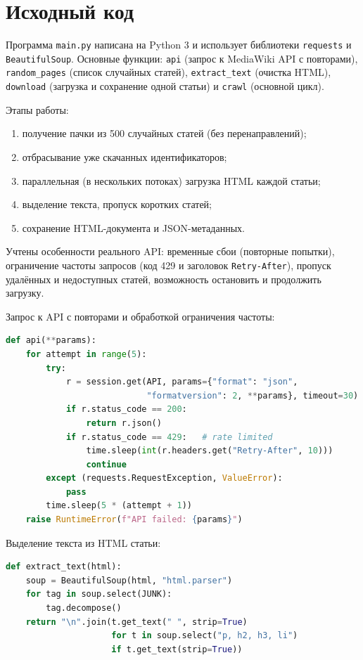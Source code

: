 \section{Исходный код}
Программа \texttt{main.py} написана на Python 3 и использует библиотеки
\texttt{requests} и \texttt{BeautifulSoup}. Основные функции: \texttt{api} (запрос
к MediaWiki API с повторами), \texttt{random\_pages} (список случайных статей),
\texttt{extract\_text} (очистка HTML), \texttt{download} (загрузка и сохранение
одной статьи) и \texttt{crawl} (основной цикл).

Этапы работы:
\begin{enumerate}
    \item получение пачки из 500 случайных статей (без перенаправлений);
    \item отбрасывание уже скачанных идентификаторов;
    \item параллельная (в нескольких потоках) загрузка HTML каждой статьи;
    \item выделение текста, пропуск коротких статей;
    \item сохранение HTML-документа и JSON-метаданных.
\end{enumerate}

Учтены особенности реального API: временные сбои (повторные попытки), ограничение
частоты запросов (код 429 и заголовок \texttt{Retry-After}), пропуск удалённых и
недоступных статей, возможность остановить и продолжить загрузку.

Запрос к API с повторами и обработкой ограничения частоты:

\begin{lstlisting}[language=Python]
def api(**params):
    for attempt in range(5):
        try:
            r = session.get(API, params={"format": "json",
                            "formatversion": 2, **params}, timeout=30)
            if r.status_code == 200:
                return r.json()
            if r.status_code == 429:   # rate limited
                time.sleep(int(r.headers.get("Retry-After", 10)))
                continue
        except (requests.RequestException, ValueError):
            pass
        time.sleep(5 * (attempt + 1))
    raise RuntimeError(f"API failed: {params}")
\end{lstlisting}

Выделение текста из HTML статьи:

\begin{lstlisting}[language=Python]
def extract_text(html):
    soup = BeautifulSoup(html, "html.parser")
    for tag in soup.select(JUNK):
        tag.decompose()
    return "\n".join(t.get_text(" ", strip=True)
                     for t in soup.select("p, h2, h3, li")
                     if t.get_text(strip=True))
\end{lstlisting}

